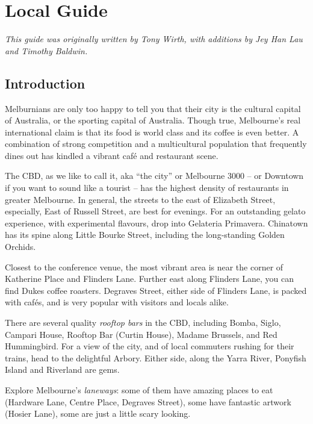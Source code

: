 \chapter{Local Guide}
\thispagestyle{emptyheader}

\emph{This guide was originally written by Tony Wirth, with additions by 
  Jey Han Lau and Timothy Baldwin.}

\section*{Introduction}

Melburnians are only too happy to tell you that their city is the cultural
capital of Australia, or the sporting capital of Australia.
Though true, Melbourne's real international claim is that its food is 
world class and its coffee is even better.
A combination of strong competition and a multicultural
population that frequently dines out
has kindled a vibrant caf{\'e} and restaurant scene.

The CBD, as we like to call it, aka ``the city'' or Melbourne 3000 -- or
Downtown if you want to sound like a tourist -- has the highest density
of restaurants in greater Melbourne. In general, the streets to the east
of Elizabeth Street, especially, East of Russell Street, are best for
evenings.  For an outstanding gelato experience, with experimental
flavours, drop into Gelateria Primavera. Chinatown has its spine along
Little Bourke Street, including the long-standing Golden Orchids.

Closest to the conference venue,
the most vibrant area
is near the corner of
Katherine Place and Flinders Lane.
Further east along Flinders Lane,
you can find Dukes coffee roasters.
Degraves Street, either side of Flinders Lane, is packed with caf{\'e}s,
and is very popular with visitors and locals alike.

There are several quality \emph{rooftop bars} in the CBD,
including Bomba, Siglo, Campari
House, Rooftop Bar (Curtin House), Madame Brussels, and Red Hummingbird.
For a view of the city, and of local commuters rushing for
their trains, head to the delightful Arbory. Either side, along the 
Yarra River, Ponyfish Island and Riverland are gems.

Explore Melbourne's {\em laneways}: some of them have amazing places to 
eat (Hardware Lane, Centre Place, Degraves Street), some have fantastic artwork (Hosier Lane), some are just a little scary looking.

